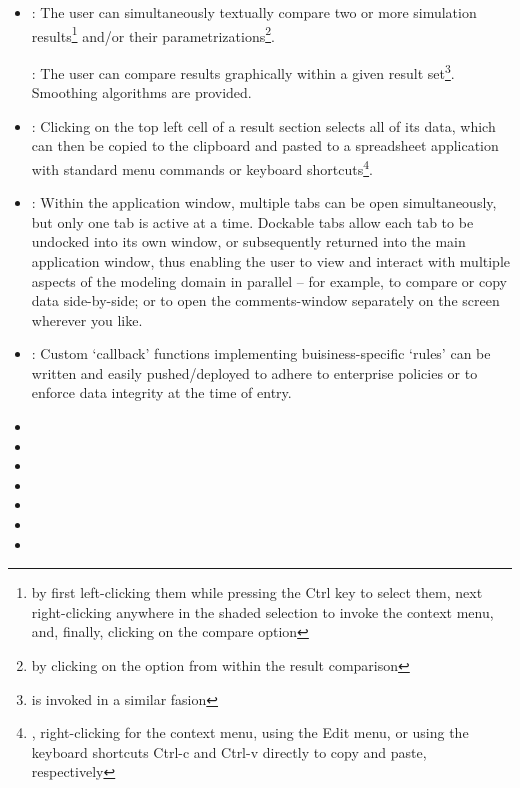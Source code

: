 \begin{itemize}
	\item \label{feature:Compare}
		: The user can simultaneously textually compare two or more simulation 
		results\footnote{ by first left-clicking them 
		while pressing the Ctrl key to select them, next right-clicking anywhere in the shaded 
		selection to invoke the context menu, and, finally, clicking on the compare option} and/or 
		their parametrizations\footnote{by clicking on the  
		option from within the result comparison}.
		
		: The user can compare results graphically within a given result 
		set\footnote{ is invoked in a similar fasion}. Smoothing algorithms are provided.
		
	\item \label{feature:Clipboard}
		: Clicking on the top left cell of a result 
		section selects all of its data, which can then be copied to the clipboard and pasted 
		to a spreadsheet application with standard menu commands or keyboard shortcuts\footnote{
		\eg, right-clicking for the context menu, using the Edit menu, or using the keyboard 
		shortcuts Ctrl-c and Ctrl-v directly to copy and paste, respectively}.
	\item \label{feature:Dockable}
		: Within the application window, multiple tabs can be open 
		simultaneously, but only one tab is active at a time. Dockable tabs allow each tab 
		to be undocked into its own window, or subsequently returned into the main application 
		window, thus enabling the user to view and interact with multiple aspects of the 
		modeling domain in parallel -- for example, to compare or copy data side-by-side; or to open the comments-window separately on the screen wherever you like.
	\item \label{feature:Validation}
		: Custom `callback' functions implementing buisiness-specific `rules'
		can be written and easily pushed/deployed to adhere to enterprise policies or to 
		enforce data integrity at the time of entry.
	\item {}
	\item {}
	\item {}
	\item {}
	\item \term{}
	\item \term{}
	\item \term{}
	
\end{itemize}
